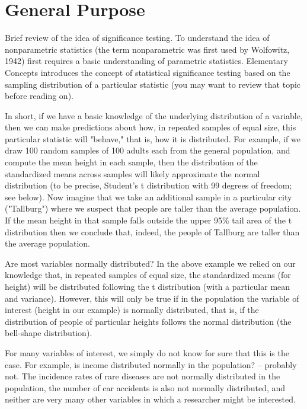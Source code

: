 \section*{General Purpose}

Brief review of the idea of significance testing. To understand the idea of nonparametric statistics (the 
term nonparametric was first used by Wolfowitz, 1942) first requires a basic understanding of parametric 
statistics. Elementary Concepts introduces the concept of statistical significance testing based on the 
sampling distribution of a particular statistic (you may want to review that topic before reading on). 

In short, if we have a basic knowledge of the underlying distribution of a variable, then we can make 
predictions about how, in repeated samples of equal size, this particular statistic will "behave," that is, 
how it is distributed. For example, if we draw 100 random samples of 100 adults each from the general 
population, and compute the mean height in each sample, then the distribution of the standardized 
means across samples will likely approximate the normal distribution (to be precise, Student's t distribution 
with 99 degrees of freedom; see below). Now imagine that we take an additional sample in a particular 
city ("Tallburg") where we suspect that people are taller than the average population. 
If the mean height in that sample falls outside the upper 95\% tail area of the t distribution then we conclude that, indeed, the people of Tallburg are taller than the average population.

Are most variables normally distributed? In the above example we relied on our knowledge that, in repeated samples of 
equal size, the standardized means (for height) will be distributed following the t distribution (with a particular 
mean and variance). However, this will only be true if in the population the variable of interest (height in our example) 
is normally distributed, that is, if the distribution of people of particular heights follows the normal distribution 
(the bell-shape distribution).

For many variables of interest, we simply do not know for sure that this is the case. 
For example, is income distributed normally in the population? -- probably not. The incidence rates of rare diseases 
are not normally distributed in the population, the number of car accidents is also not normally distributed, and 
neither are very many other variables in which a researcher might be interested.


